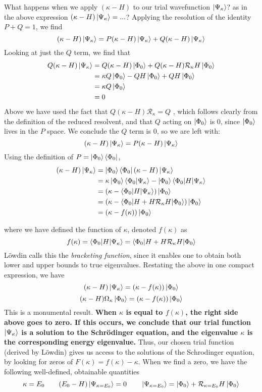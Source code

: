 \documentclass{article}
\begin{document}
What happens when we apply $(\kappa - H)$ to our trial wavefunction $\ket{\Psi_{\kappa}}$? 
as in the above expression $(\kappa - H) \ket{\Psi_{\kappa}} = ... $?
Applying the resolution of the identity $P + Q = 1$, we find
\[ (\kappa - H) \ket{\Psi_{\kappa}} =  P (\kappa - H) \ket{\Psi_{\kappa}} + Q (\kappa - H) \ket{\Psi_{\kappa}}  \]
Looking at just the $Q$ term, we find that
\begin{align*}
Q (\kappa - H) \ket{\Psi_{\kappa}} &= Q (\kappa - H) \ket{\Phi_0} + Q (\kappa - H) \mathcal{R}_{\kappa} H \ket{\Phi_0}  \\
&= \kappa Q \ket{\Phi_0} - Q H \ket{\Phi_0} + Q H \ket{\Phi_0}  \\
&= \kappa Q \ket{\Phi_0}  \\
&= 0
\end{align*}
Above we have used the fact that $ Q (\kappa - H) \mathcal{R}_{\kappa}  = Q$ , which follows
clearly from the definition of the reduced resolvent, and that $Q$ acting on $\ket{\Phi_0}$ is 0, since 
$\ket{\Phi_0}$ lives in the $P$ space. 
We conclude the $Q$ term is 0, so we are left with:
\[ (\kappa - H) \ket{\Psi_{\kappa}} =  P (\kappa - H) \ket{\Psi_{\kappa}} \]
Using the definition of $P = \ket{\Phi_0}\bra{\Phi_0}$,
\begin{align*}
 (\kappa - H) \ket{\Psi_{\kappa}} &=  \ket{\Phi_0}\bra{\Phi_0} (\kappa - H) \ket{\Psi_{\kappa}} \\
 &=  \kappa \ket{\Phi_0} \braket{\Phi_0|\Psi_\kappa} - \ket{\Phi_0} \braket{\Phi_0| H | \Psi_\kappa} \\
 &= (\kappa - \braket{\Phi_0 | H | \Psi_\kappa}) \ket{\Phi_0} \\
 &= (\kappa - \braket{\Phi_0 | H + H \mathcal{R}_\kappa H  | \Phi_0} ) \ket{\Phi_0} \\
 &= (\kappa - f(\kappa)) \ket{\Phi_0}
\end{align*}

where we have defined the function of $\kappa$, denoted  $f(\kappa)$ as
\[ f(\kappa) =  \braket{\Phi_0 | H | \Psi_\kappa} = \braket{\Phi_0 | H + H \mathcal{R}_\kappa H  | \Phi_0}\]
L{\"o}wdin calls this the \textit{bracketing function}, since it enables one to obtain both lower and upper bounds to true eigenvalues.
Restating the above in one compact expression, we have 
\[ (\kappa - H) \ket{\Psi_{\kappa}} = (\kappa - f(\kappa)) \ket{\Phi_0} \]
\[ (\kappa - H) \Omega_\kappa \ket{\Phi_0} = (\kappa - f(\kappa)) \ket{\Phi_0} \]
This is a monumental result.
\textbf{When $\kappa$ is equal to $f(\kappa)$, the right side above goes to zero. If this occurs,
we conclude that our trial function $\ket{\Psi_{\kappa}}$
is a solution to the Schr{\"o}dinger equation, and the eigenvalue $\kappa$ is the corresponding 
energy eigenvalue.}  
Thus, our chosen trial function (derived by L{\"o}wdin) gives us access to the solutions of 
the Schrodinger equation, by looking for zeros of $F(\kappa) = f(\kappa) - \kappa$.
When we find a zero, we have the following well-defined, obtainable quantities
\[ \kappa = E_0 \quad \quad (E_0 - H) \ket{\Psi_{\kappa=E_0}} = 0 \quad \quad \ket{\Psi_{\kappa=E_0}} = \ket{\Phi_0} + \mathcal{R}_{\kappa = E_0} H \ket{\Phi_0} \]
\end{document}
